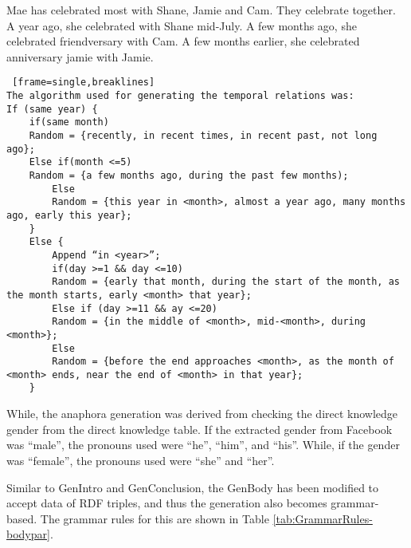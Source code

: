 \begin{center}Mae has celebrated most with Shane, Jamie and Cam. They celebrate together. A year ago, she celebrated with Shane mid-July. A few months ago, she celebrated friendversary with Cam. A few months earlier, she celebrated anniversary jamie with Jamie.\end{center}

\begin{lstlisting} [frame=single,breaklines]
The algorithm used for generating the temporal relations was:
If (same year) {
	if(same month)
	Random = {recently, in recent times, in recent past, not long ago};
	Else if(month <=5)
	Random = {a few months ago, during the past few months);
		Else
		Random = {this year in <month>, almost a year ago, many months ago, early this year};
	}
	Else {
		Append “in <year>”;
		if(day >=1 && day <=10)
		Random = {early that month, during the start of the month, as the month starts, early <month> that year};
		Else if (day >=11 && ay <=20)
		Random = {in the middle of <month>, mid-<month>, during <month>};
		Else 
		Random = {before the end approaches <month>, as the month of <month> ends, near the end of <month> in that year};
	}
	\end{lstlisting}

While, the anaphora generation was derived from checking the direct knowledge gender from the direct knowledge table. If the extracted gender from Facebook was ``male'', the pronouns used were ``he'', ``him'', and ``his''. While, if the gender was ``female'', the pronouns used were ``she'' and ``her''.

Similar to GenIntro and GenConclusion, the GenBody has been modified to accept data of RDF triples, and thus the generation also becomes grammar-based. The grammar rules for this are shown in Table \ref{tab:GrammarRules-bodypar}.

